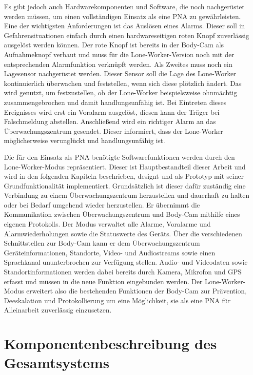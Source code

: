 \documentclass[thesis.tex]{subfiles}
\begin{document}
Es gibt jedoch auch Hardwarekomponenten und Software, die noch nachgerüstet werden müssen, um einen vollständigen Einsatz als eine PNA zu gewährleisten.
Eine der wichtigsten Anforderungen ist das Auslösen eines Alarms.
Dieser soll in Gefahrensituationen einfach durch einen hardwareseitigen roten Knopf zuverlässig ausgelöst werden können.
Der rote Knopf ist bereits in der Body-Cam als Aufnahmeknopf verbaut und muss für die Lone-Worker-Version noch mit der entsprechenden Alarmfunktion verknüpft werden.
Als Zweites muss noch ein Lagesensor nachgerüstet werden.
Dieser Sensor soll die Lage des Lone-Worker kontinuierlich überwachen und feststellen, wenn sich diese plötzlich ändert.
Das wird genutzt, um festzustellen, ob der Lone-Worker beispielsweise ohnmächtig zusammengebrochen und damit handlungsunfähig ist.
Bei Eintreten dieses Ereignisses wird erst ein Voralarm ausgelöst, diesen kann der Träger bei Falschmeldung abstellen.
Anschließend wird ein richtiger Alarm an das Überwachungszentrum gesendet.
Dieser informiert, dass der Lone-Worker möglicherweise verunglückt und handlungsunfähig ist.

Die für den Einsatz als PNA benötigte Softwarefunktionen werden durch den Lone-Worker-Modus repräsentiert.
Dieser ist Hauptbestandteil dieser Arbeit und wird in den folgenden Kapiteln beschrieben, designt und als Prototyp mit seiner Grundfunktionalität implementiert.
Grundsätzlich ist dieser dafür zuständig eine Verbindung zu einem Überwachungszentrum herzustellen und dauerhaft zu halten oder bei Bedarf umgehend wieder herzustellen.
Er übernimmt die Kommunikation zwischen Überwachungszentrum und Body-Cam mithilfe eines eigenen Protokolls.
Der Modus verwaltet alle Alarme, Voralarme und Alarmwiederholungen sowie die Statuswerte des Geräts.
Über die verschiedenen Schnittstellen zur Body-Cam kann er dem Überwachungszentrum Geräteinformationen, Standorte, Video- und Audiostreams sowie einen Sprachkanal ununterbrochen zur Verfügung stellen.
Audio- und Videodaten sowie Standortinformationen werden dabei bereits durch Kamera, Mikrofon und GPS erfasst und müssen in die neue Funktion eingebunden werden.
Der Lone-Worker-Modus erweitert also die bestehenden Funktionen der Body-Cam zur Prävention, Deeskalation und Protokollierung um eine Möglichkeit, sie als eine PNA für Alleinarbeit zuverlässig einzusetzen.

\section{Komponentenbeschreibung des Gesamtsystems}
\end{document}
